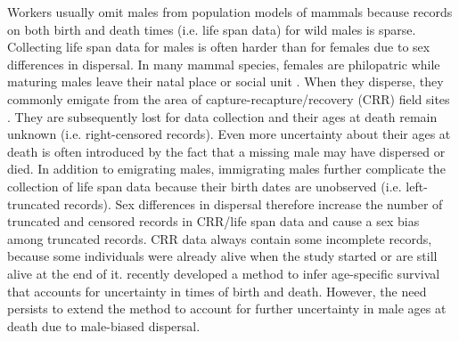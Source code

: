 \documentclass[12pt,oneside, a4paper,openright, fleqn, titlepage]{article}
\begin{document}
Workers usually omit males from population models of mammals because records on both birth and death times (i.e. life span data) for wild males is sparse. Collecting life span data for males is often harder than for females due to sex differences in dispersal. In many mammal species, females are philopatric while maturing males leave their natal place or social unit . When they disperse, they commonly emigate from the area of capture-recapture/recovery (CRR) field sites . They are subsequently lost for data collection and their ages at death remain unknown (i.e. right-censored records). %
Even more uncertainty about their ages at death is often introduced by the fact that a missing male may have dispersed or died. In addition to emigrating males, immigrating males further complicate the collection of life span data because their birth dates are unobserved (i.e. left-truncated records). Sex differences in dispersal therefore increase the number of truncated and censored records in CRR/life span data and cause a sex bias among truncated records. CRR data always contain some incomplete records, because some individuals were already alive when the study started or are still alive at the end of it. recently developed a method to infer age-specific survival that accounts for uncertainty in times of birth and death. However, the need persists to extend the method to account for further uncertainty in male ages at death due to male-biased dispersal.
\end{document}
